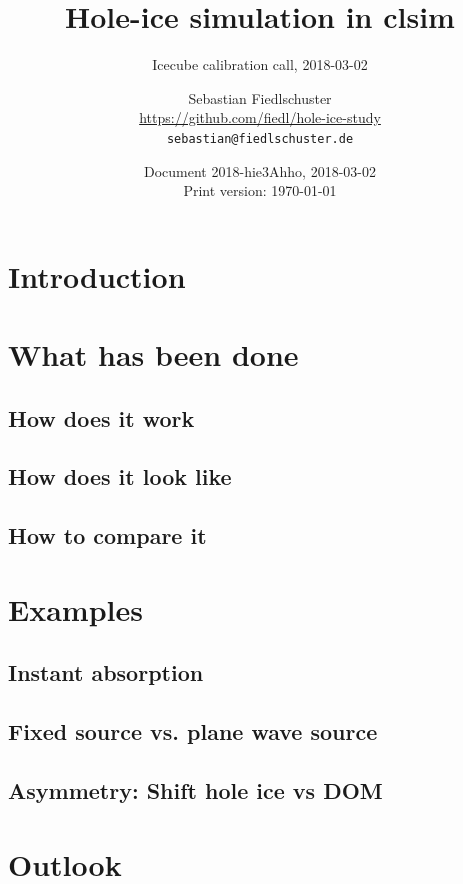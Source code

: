 \documentclass[green, 12pt]{beamer}
\title{Hole-ice simulation in clsim}
\subtitle{Icecube calibration call, 2018-03-02}
\date{Document 2018-hie3Ahho, 2018-03-02 \\ \tiny{Print version: \today}}
\author[Sebastian Fiedlschuster \texttt{<sebastian@fiedlschuster.de>}]{Sebastian Fiedlschuster \\ \tiny{\url{https://github.com/fiedl/hole-ice-study}} \\ \tiny\texttt{sebastian@fiedlschuster.de}}
\institute{Erlangen Centre for Astroparticle Physics}
\newif\ifplacelogo %
\begin{document}



\section{Introduction}
  
  
\placelogofalse

\section{What has been done}
\subsection{How does it work}
  
  
\subsection{How does it look like}
  
\subsection{How to compare it}
  

\section{Examples}
\subsection{Instant absorption}
  
\subsection{Fixed source vs. plane wave source}
  
  
\subsection{Asymmetry: Shift hole ice vs DOM}
  

\section{Outlook}
\end{document}
